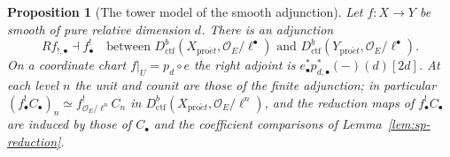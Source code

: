 \documentclass[11pt,a4paper]{article}
\numberwithin{equation}{section}
\newtheorem{proposition}[theorem]{Proposition}
\theoremstyle{definition}
\theoremstyle{remark}
\newcommand{\proet}{\mathrm{pro}\acute{e}t}
\newcommand{\Dctf}{D^b_{\mathrm{ctf}}}
\begin{document}
\begin{proposition}[The tower model of the smooth adjunction]
\label{prop:sp-tower-geometric}
Let $f:X\to Y$ be smooth of pure relative dimension $d$. There is an
adjunction
\begin{equation}\label{eq:sp-tower-adjunction}
 Rf_{!,\bullet}\dashv f_\bullet^!
       \quad\text{between }\Dctf(X_{\proet},\mathcal O_E/\ell^\bullet)
       \text{ and }\Dctf(Y_{\proet},\mathcal O_E/\ell^\bullet).
\end{equation}
On a coordinate chart $f|_U=p_d\circ e$ the right adjoint is
$e_\bullet^*p_{d,\bullet}^*(-)(d)[2d]$. At each level $n$ the unit and
counit are those of the finite adjunction; in particular
$(f_\bullet^!C_\bullet)_n\simeq f_{\mathcal O_E/\ell^n}^!C_n$ in
$\Dctf(X_{\proet},\mathcal O_E/\ell^n)$, and the
reduction maps of $f_\bullet^!C_\bullet$ are induced by those of
$C_\bullet$ and the coefficient comparisons of
Lemma~\ref{lem:sp-reduction}.
\end{proposition}
\end{document}
